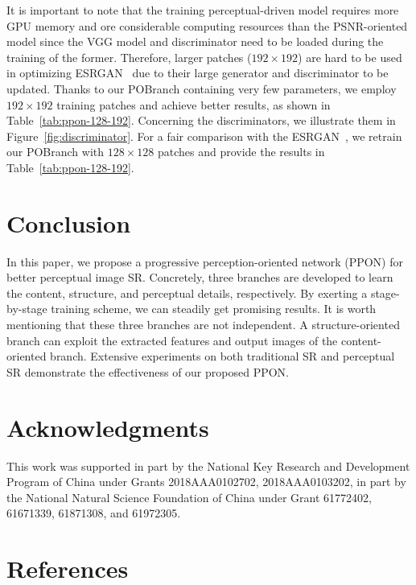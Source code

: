 \documentclass[preprint]{elsarticle}
\begin{document}
It is important to note that the training perceptual-driven model requires more GPU memory and ore considerable computing resources than the PSNR-oriented model since the VGG model and discriminator need to be loaded during the training of the former. Therefore, larger patches ($192 \times 192$) are hard to be used in optimizing ESRGAN~\cite{ESRGAN} due to their large generator and discriminator to be updated. Thanks to our POBranch containing very few parameters, we employ $192 \times 192$ training patches and achieve better results, as shown in Table~\ref{tab:ppon-128-192}. Concerning the discriminators, we illustrate them in Figure~\ref{fig:discriminator}. For a fair comparison with the ESRGAN~\cite{ESRGAN}, we retrain our POBranch with $128 \times 128$ patches and provide the results in Table~\ref{tab:ppon-128-192}. 

\begin{figure*}[htpb]
	\centering
	\hfil
	\caption{The network structure of the discriminators. The output size is scaled down by stride 2, and the parameter of LReLU is $0.2$.}
	\label{fig:discriminator}
\end{figure*}


\section{Conclusion}\label{sec:conclusion}

In this paper, we propose a progressive perception-oriented network (PPON) for better perceptual image SR. Concretely, three branches are developed to learn the content, structure, and perceptual details, respectively. By exerting a stage-by-stage training scheme, we can steadily get promising results.  It is worth mentioning that these three branches are not independent. A structure-oriented branch can exploit the extracted features and output images of the content-oriented branch. Extensive experiments on both traditional SR and perceptual SR demonstrate the effectiveness of our proposed PPON. 

\section*{Acknowledgments}
This work was supported in part by the National Key Research and Development Program of China under Grants 2018AAA0102702, 2018AAA0103202, in part by the National Natural Science Foundation of China under Grant 61772402, 61671339, 61871308, and 61972305.

\section*{References}


\end{document}
